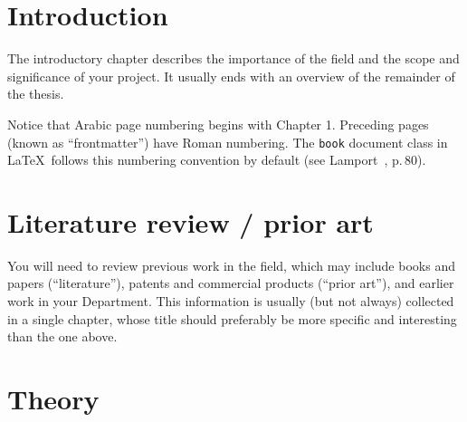 \documentclass[12pt,openany,a4paper]{book}
\begin{document}
\tableofcontents

\listoffigures
{}

\listoftables
{}

% 

\cleardoublepage

\mainmatter


%
%
%
%	
%	

\chapter{Introduction}

The introductory chapter describes the importance of the field and the
scope and significance of your project.  It usually ends with an
overview of the remainder of the thesis.

Notice that Arabic page numbering begins with Chapter 1.  Preceding
pages (known as ``frontmatter'') have Roman numbering.  The
\texttt{book} document class in \LaTeX\ follows this numbering
convention by default (see Lamport~\cite{lamport}, p.\,80).

\chapter{Literature review / prior art}

You will need to review previous work in the field, which may include
books and papers (``literature''), patents and commercial products
(``prior art''), and earlier work in your Department.  This
information is usually (but not always) collected in a single chapter,
whose title should preferably be more specific and interesting than
the one above.

\chapter{Theory}
\end{document}
